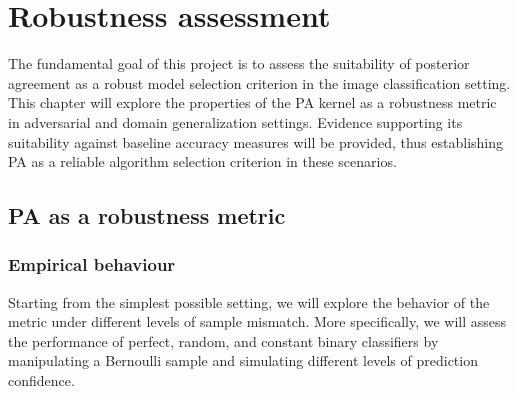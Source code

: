 \chapter{Robustness assessment}\label{chapter:robustness_assessment}

The fundamental goal of this project is to assess the suitability of posterior
agreement as a robust model selection criterion in the image classification setting.
This chapter will explore the properties of the PA kernel as a robustness metric in
adversarial and domain generalization settings. Evidence supporting its suitability against 
baseline accuracy measures will be provided, thus establishing PA as a reliable
algorithm selection criterion in these scenarios.

\section{PA as a robustness metric}\label{sec:results_robustness}

\subsection{Empirical behaviour}

Starting from the simplest possible setting, we will explore the behavior of the metric 
under different levels of sample mismatch. More specifically, we will assess the performance 
of perfect, random, and constant binary classifiers by manipulating a 
Bernoulli sample and simulating different levels of prediction confidence.


